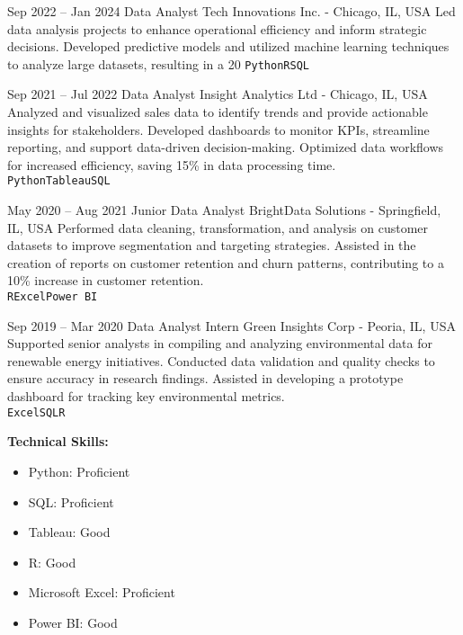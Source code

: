 \documentclass[9pt]{cvitae}
\begin{document}

\begin{entrylist}
    \entry
    {Sep 2022 -- Jan 2024}   
    {Data Analyst}
    {Tech Innovations Inc. - Chicago, IL, USA}
    {Led data analysis projects to enhance operational efficiency and inform strategic decisions. Developed predictive models and utilized machine learning techniques to analyze large datasets, resulting in a 20%
    \texttt{Python}\slashsep\texttt{R}\slashsep\texttt{SQL}}

    \entry
        {Sep 2021 -- Jul 2022}   
        {Data Analyst}
        {Insight Analytics Ltd - Chicago, IL, USA}
        {Analyzed and visualized sales data to identify trends and provide actionable insights for stakeholders. Developed dashboards to monitor KPIs, streamline reporting, and support data-driven decision-making. Optimized data workflows for increased efficiency, saving 15\% in data processing time.\\
        \texttt{Python}\slashsep\texttt{Tableau}\slashsep\texttt{SQL}}

    \entry
        {May 2020 -- Aug 2021}
        {Junior Data Analyst}
        {BrightData Solutions - Springfield, IL, USA}
        {Performed data cleaning, transformation, and analysis on customer datasets to improve segmentation and targeting strategies. Assisted in the creation of reports on customer retention and churn patterns, contributing to a 10\% increase in customer retention.\\
        \texttt{R}\slashsep\texttt{Excel}\slashsep\texttt{Power BI}}

    \entry
        {Sep 2019 -- Mar 2020}
        {Data Analyst Intern}
        {Green Insights Corp - Peoria, IL, USA}
        {Supported senior analysts in compiling and analyzing environmental data for renewable energy initiatives. Conducted data validation and quality checks to ensure accuracy in research findings. Assisted in developing a prototype dashboard for tracking key environmental metrics.\\
        \texttt{Excel}\slashsep\texttt{SQL}\slashsep\texttt{R}}
\end{entrylist}


\textbf{Technical Skills:} \vspace{5pt}
\begin{multicols}{2}
    \begin{itemize}
        \item Python: Proficient
        \item SQL: Proficient
        \item Tableau: Good
        \item R: Good
        \item Microsoft Excel: Proficient
        \item Power BI: Good
    \end{itemize}
\end{multicols}
\end{document}
